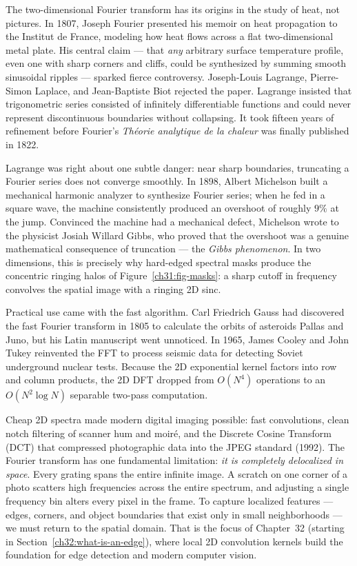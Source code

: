 \begin{historybox}
The two-dimensional Fourier transform has its origins in the study of heat,
not pictures. In 1807, Joseph Fourier presented his memoir on heat propagation
to the Institut de France, modeling how heat flows across a flat two-dimensional metal
plate. His central claim --- that \emph{any} arbitrary surface temperature profile, even
one with sharp corners and cliffs, could be synthesized by summing smooth sinusoidal
ripples --- sparked fierce controversy. Joseph-Louis Lagrange, Pierre-Simon Laplace,
and Jean-Baptiste Biot rejected the paper. Lagrange insisted that trigonometric series
consisted of infinitely differentiable functions and could never represent discontinuous
boundaries without collapsing. It took fifteen years of refinement before Fourier's
\emph{Th\'eorie analytique de la chaleur} was finally published in 1822.

Lagrange was right about one subtle danger: near sharp boundaries, truncating a
Fourier series does not converge smoothly. In 1898, Albert Michelson built a mechanical
harmonic analyzer to synthesize Fourier series; when he fed in a square wave, the machine
consistently produced an overshoot of roughly $9\%$ at the jump. Convinced the machine
had a mechanical defect, Michelson wrote to the physicist Josiah Willard Gibbs, who
proved that the overshoot was a genuine mathematical consequence of truncation ---
the \emph{Gibbs phenomenon}. In two dimensions, this is precisely why hard-edged
spectral masks produce the concentric ringing halos of Figure~\ref{ch31:fig-masks}:
a sharp cutoff in frequency convolves the spatial image with a ringing 2D sinc.

Practical use came with the fast algorithm. Carl Friedrich Gauss had
discovered the fast Fourier transform in 1805 to calculate the orbits of asteroids
Pallas and Juno, but his Latin manuscript went unnoticed. In 1965, James Cooley
and John Tukey reinvented the FFT to process seismic data for detecting Soviet underground
nuclear tests. Because the 2D exponential kernel factors into row and column products,
the 2D DFT dropped from $O(N^4)$ operations to an
$O(N^2 \log N)$ separable two-pass computation.

Cheap 2D spectra made modern digital imaging possible: fast
convolutions, clean notch filtering of scanner hum and moir\'e, and the Discrete Cosine
Transform (DCT) that compressed photographic data into the JPEG standard (1992).
The Fourier transform has one fundamental limitation: \emph{it is completely
delocalized in space}. Every grating spans the entire infinite image. A scratch on one
corner of a photo scatters high frequencies across the entire spectrum, and adjusting
a single frequency bin alters every pixel in the frame. To capture localized features ---
edges, corners, and object boundaries that exist only in small neighborhoods --- we must
return to the spatial domain. That is the focus of Chapter~32 (starting in Section~\ref{ch32:what-is-an-edge}),
where local 2D convolution kernels build the foundation for edge detection and modern
computer vision.
\end{historybox}

